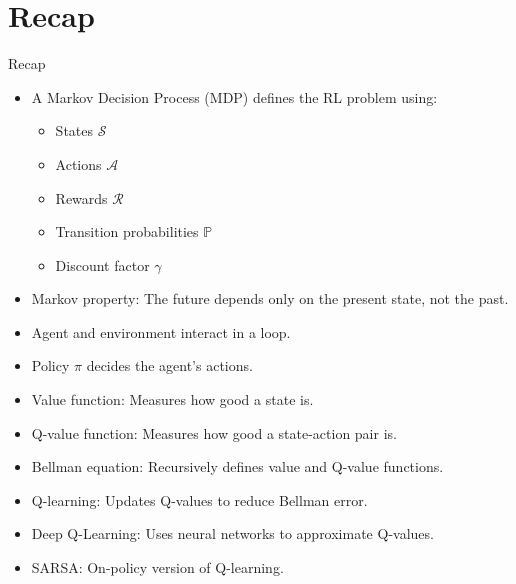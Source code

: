 \section{Recap}
\begin{frame}[allowframebreaks]{Recap}
    \begin{itemize}
        \setlength{\itemsep}{1em}
        \item A Markov Decision Process (MDP) defines the RL problem using:
        \begin{itemize}
            \item States $\mathcal{S}$
            \item Actions $\mathcal{A}$
            \item Rewards $\mathcal{R}$
            \item Transition probabilities $\mathbb{P}$
            \item Discount factor $\gamma$
        \end{itemize}
        \item Markov property: The future depends only on the present state, not the past.
        \item Agent and environment interact in a loop.
        \item Policy $\pi$ decides the agent's actions.
        \item Value function: Measures how good a state is.
        \item Q-value function: Measures how good a state-action pair is.
        \item Bellman equation: Recursively defines value and Q-value functions.
        \item Q-learning: Updates Q-values to reduce Bellman error.
        \item Deep Q-Learning: Uses neural networks to approximate Q-values.
        \item SARSA: On-policy version of Q-learning.
    \end{itemize}
\end{frame}